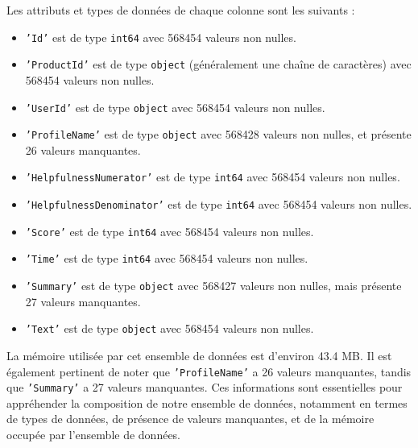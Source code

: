 Les attributs et types de données de chaque colonne sont les suivants :
\begin{itemize}
    \item \texttt{'Id'} est de type \texttt{int64} avec 568454 valeurs non nulles.
    \item \texttt{'ProductId'} est de type \texttt{object} (généralement une chaîne de caractères) avec 568454 valeurs non nulles.
    \item \texttt{'UserId'} est de type \texttt{object} avec 568454 valeurs non nulles.
    \item \texttt{'ProfileName'} est de type \texttt{object} avec 568428 valeurs non nulles, et présente 26 valeurs manquantes.
    \item \texttt{'HelpfulnessNumerator'} est de type \texttt{int64} avec 568454 valeurs non nulles.
    \item \texttt{'HelpfulnessDenominator'} est de type \texttt{int64} avec 568454 valeurs non nulles.
    \item \texttt{'Score'} est de type \texttt{int64} avec 568454 valeurs non nulles.
    \item \texttt{'Time'} est de type \texttt{int64} avec 568454 valeurs non nulles.
    \item \texttt{'Summary'} est de type \texttt{object} avec 568427 valeurs non nulles, mais présente 27 valeurs manquantes.
    \item \texttt{'Text'} est de type \texttt{object} avec 568454 valeurs non nulles.
\end{itemize}

La mémoire utilisée par cet ensemble de données est d'environ 43.4 MB. Il est également pertinent de noter que \texttt{'ProfileName'} a 26 valeurs manquantes, tandis que \texttt{'Summary'} a 27 valeurs manquantes. Ces informations sont essentielles pour appréhender la composition de notre ensemble de données, notamment en termes de types de données, de présence de valeurs manquantes, et de la mémoire occupée par l'ensemble de données.



